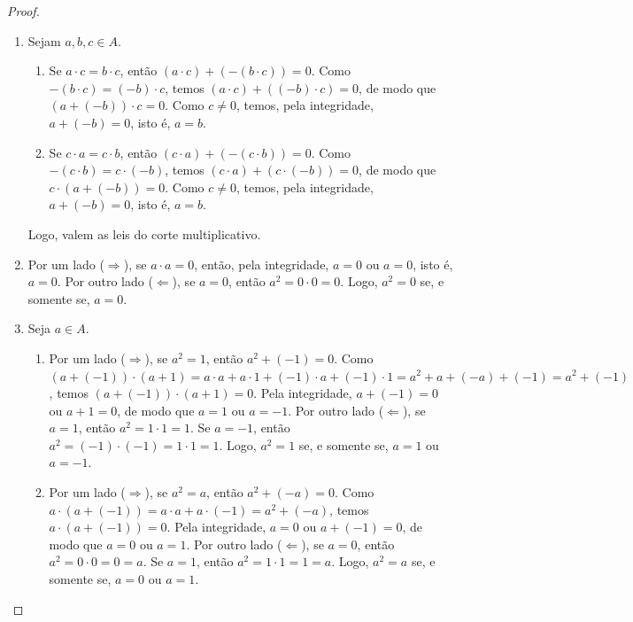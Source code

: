 \begin{proof}
    \leavevmode
        \begin{enumerate}[leftmargin=*, align=left, label=\textbf{(\alph*)}]
            \item Sejam $a,b,c \in A$.
                \begin{enumerate}[label=\roman*.]
                    \item Se $a \cdot c = b \cdot c$, então $(a \cdot c) + (-(b \cdot c)) = 0$. Como $-(b \cdot c) = (-b) \cdot c$, temos $(a \cdot c) + ((-b) \cdot c) = 0$, de modo que $(a + (-b)) \cdot c = 0$. Como $c \neq 0$, temos, pela integridade, $a + (-b) = 0$, isto é, $a = b$.
                    \item Se $c \cdot a = c \cdot b$, então $(c \cdot a) + (-(c \cdot b)) = 0$. Como $-(c \cdot b) = c \cdot (-b)$, temos $(c \cdot a) + (c \cdot (-b)) = 0$, de modo que $c \cdot (a + (-b)) = 0$. Como $c \neq 0$, temos, pela integridade, $a + (-b) = 0$, isto é, $a = b$.
                \end{enumerate}
            Logo, valem as leis do corte multiplicativo. \blackproof
            \item Por um lado ($\Rightarrow$), se $a \cdot a = 0$, então, pela integridade, $a = 0$ ou $a = 0$, isto é, $a = 0$. Por outro lado ($\Leftarrow$), se $a = 0$, então $a^2 = 0 \cdot 0 = 0$. Logo, $a^2 = 0$ se, e somente se, $a = 0$. \blackproof
            \item Seja $a \in A$.
                \begin{enumerate}[label=\roman*.]
                    \item Por um lado ($\Rightarrow$), se $a^2 = 1$, então $a^2 + (-1) = 0$. Como $(a + (-1)) \cdot (a + 1) = a \cdot a + a \cdot 1 + (-1) \cdot a + (-1) \cdot 1 = a^2 + a + (-a) + (-1) = a^2 + (-1)$, temos $(a + (-1)) \cdot (a + 1) = 0$. Pela integridade, $a + (-1) = 0$ ou $a + 1 = 0$, de modo que $a = 1$ ou $a = -1$. Por outro lado ($\Leftarrow$), se $a = 1$, então $a^2 = 1 \cdot 1 = 1$. Se $a = -1$, então $a^2 = (-1) \cdot (-1) = 1 \cdot 1 = 1$. Logo, $a^2 = 1$ se, e somente se, $a=1$ ou $a=-1$.
                    \item Por um lado ($\Rightarrow$), se $a^2 = a$, então $a^2 + (-a) = 0$. Como $a \cdot (a + (-1)) = a \cdot a + a \cdot (-1) = a^2 + (-a)$, temos $a \cdot (a + (-1)) = 0$. Pela integridade, $a = 0$ ou $a + (-1) = 0$, de modo que $a = 0$ ou $a = 1$. Por outro lado ($\Leftarrow$), se $a = 0$, então $a^2 = 0 \cdot 0 = 0 = a$. Se $a = 1$, então $a^2 = 1 \cdot 1 = 1 = a$. Logo, $a^2 = a$ se, e somente se, $a = 0$ ou $a=1$.
                \end{enumerate}
        \end{enumerate}
\end{proof}

